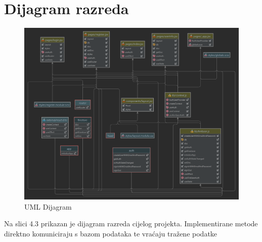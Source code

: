 			\eject
			
		\section{Dijagram razreda}
		
			
			\begin{figure}[H]
			\includegraphics[scale=0.2]{slike/UMLDijagram.png}
			\centering
			\caption{UML Dijagram}
			\label{fig:promjene}
		          \end{figure}
			
			Na slici 4.3 prikazan je dijagram razreda cijelog projekta. Implementirane metode direktno komuniciraju s bazom podataka te vraćaju tražene podatke
			
	
			
			
			
			
			
		
			
			
			
			
